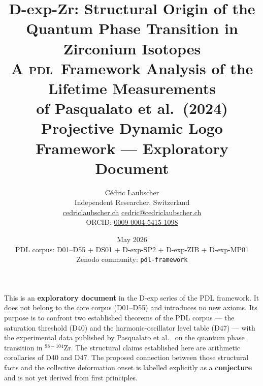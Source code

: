 \documentclass[11pt,a4paper]{article}
\theoremstyle{definition}
\theoremstyle{remark}
\newcommand{\PDL}{\textsc{pdl}}
\begin{document}
\title{\textbf{D-exp-Zr: Structural Origin of the Quantum Phase Transition
in Zirconium Isotopes}\\[8pt]
{\large A \PDL\ Framework Analysis of the Lifetime Measurements\\
of Pasqualato et al.\ (2024)}\\[6pt]
{\normalsize Projective Dynamic Logo Framework --- Exploratory Document}}

\author{C\'edric Laubscher\\[4pt]
\small Independent Researcher, Switzerland\\
\small \href{https://cedriclaubscher.ch}{cedriclaubscher.ch}\quad
\small \href{mailto:cedric@cedriclaubscher.ch}{cedric@cedriclaubscher.ch}\\
\small ORCID: \href{https://orcid.org/0009-0004-5415-1098}{0009-0004-5415-1098}}

\date{May 2026\\[4pt]
\small PDL corpus: D01--D55 + DS01 + D-exp-SP2 + D-exp-ZIB + D-exp-MP01\\
\small Zenodo community: \texttt{pdl-framework}}

\maketitle

\begin{epistemicbox}
This is an \textbf{exploratory document} in the D-exp series of the PDL framework. It does not belong to the core corpus (D01--D55) and introduces no new axioms. Its purpose is to confront two established theorems of the PDL corpus --- the saturation threshold (D40) and the harmonic-oscillator level table (D47) --- with the experimental data published by Pasqualato et al.\ \cite{Pasqualato_2024} on the quantum phase transition in $^{98-104}$Zr. The structural claims established here are arithmetic corollaries of D40 and D47. The proposed connection between those structural facts and the collective deformation onset is labelled explicitly as a \textbf{conjecture} and is not yet derived from first principles.
\end{epistemicbox}
\end{document}

